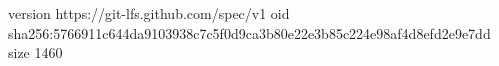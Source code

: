 version https://git-lfs.github.com/spec/v1
oid sha256:5766911c644da9103938c7c5f0d9ca3b80e22e3b85c224e98af4d8efd2e9e7dd
size 1460
